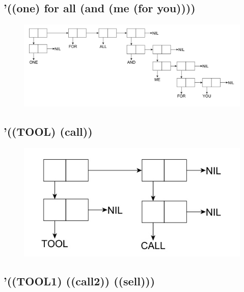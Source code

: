 \documentclass[a4paper,12pt]{article}
\begin{document}
	\subsection{'((one) for all (and (me (for you))))}
	
	\begin{figure}[h!]
		\begin{center}
			{\includegraphics[scale = 0.4]{third.jpg}}
			\label{ris:3}
		\end{center}
	\end{figure}

\newpage
	
	\subsection{'((TOOL) (call))}
	
	\begin{figure}[h!]
		\begin{center}
			{\includegraphics[scale = 0.4]{fourth.jpg}}
			\label{ris:4}
		\end{center}
	\end{figure}
	
	\subsection{'((TOOL1) ((call2)) ((sell)))}
	
\end{document}
